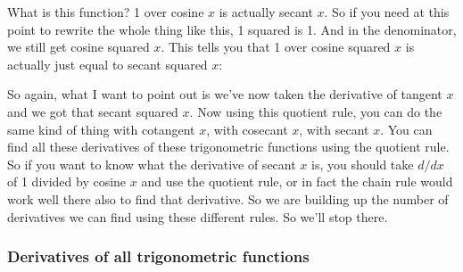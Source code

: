 \documentclass[pdftex, brazil, 12pt, twoside]{article}
\begin{document}
What is this function?
1 over cosine $x$ is actually secant $x$.
So if you need at this point to rewrite the whole thing
like this, 1 squared is 1.
And in the denominator, we still get cosine squared $x$.
This tells you that 1 over cosine
squared $x$ is actually just equal to secant squared $x$:

\begin{figure}[H]
  \begin{center}
  \end{center}
\end{figure}

So again, what I want to point out
is we've now taken the derivative of tangent $x$
and we got that secant squared $x$.
Now using this quotient rule, you
can do the same kind of thing with cotangent $x$,
with cosecant $x$, with secant $x$.
You can find all these derivatives
of these trigonometric functions using the quotient rule.
So if you want to know what the derivative of secant $x$ is,
you should take $d/dx$ of 1 divided by cosine $x$
and use the quotient rule, or in fact the chain rule
would work well there also to find that derivative.
So we are building up the number of derivatives
we can find using these different rules.
So we'll stop there.

\subsubsection{Derivatives of all trigonometric functions}
\label{u2-quotient-rule-derivatives-trig-functions}
\end{document}
